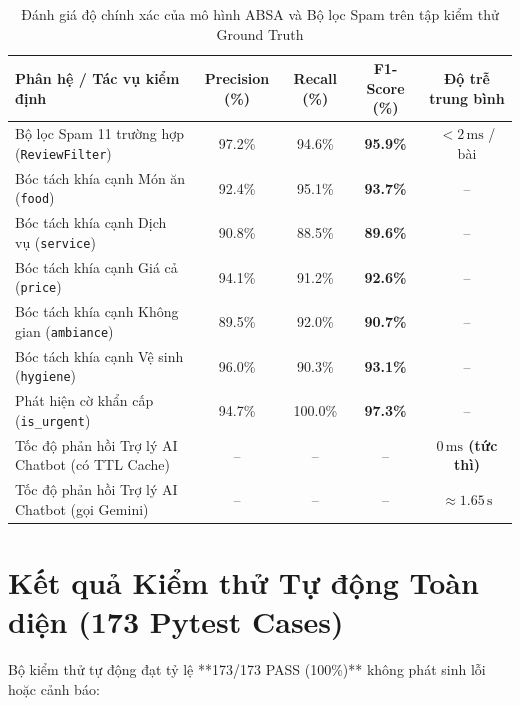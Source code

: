 \begin{table}[H]
\centering
\caption{Đánh giá độ chính xác của mô hình ABSA và Bộ lọc Spam trên tập kiểm thử Ground Truth}
\label{tab:evaluation_metrics}
\vspace{0.15cm}
\footnotesize
\begin{tabularx}{\textwidth}{l c c c c}
\toprule
\rowcolor{blue!8}
\textbf{Phân hệ / Tác vụ kiểm định} & \textbf{Precision (\%)} & \textbf{Recall (\%)} & \textbf{F1-Score (\%)} & \textbf{Độ trễ trung bình} \\
\midrule
Bộ lọc Spam 11 trường hợp (\texttt{ReviewFilter}) & 97.2\% & 94.6\% & \textbf{95.9\%} & $< 2\,\mathrm{ms}$ / bài \\
Bóc tách khía cạnh Món ăn (\texttt{food}) & 92.4\% & 95.1\% & \textbf{93.7\%} & -- \\
Bóc tách khía cạnh Dịch vụ (\texttt{service}) & 90.8\% & 88.5\% & \textbf{89.6\%} & -- \\
Bóc tách khía cạnh Giá cả (\texttt{price}) & 94.1\% & 91.2\% & \textbf{92.6\%} & -- \\
Bóc tách khía cạnh Không gian (\texttt{ambiance}) & 89.5\% & 92.0\% & \textbf{90.7\%} & -- \\
Bóc tách khía cạnh Vệ sinh (\texttt{hygiene}) & 96.0\% & 90.3\% & \textbf{93.1\%} & -- \\
Phát hiện cờ khẩn cấp (\texttt{is\_urgent}) & 94.7\% & 100.0\% & \textbf{97.3\%} & -- \\
Tốc độ phản hồi Trợ lý AI Chatbot (có TTL Cache) & -- & -- & -- & \textbf{$0\,\mathrm{ms}$ (tức thì)} \\
Tốc độ phản hồi Trợ lý AI Chatbot (gọi Gemini) & -- & -- & -- & $\approx 1.65\,\mathrm{s}$ \\
\bottomrule
\end{tabularx}
\end{table}

\section{Kết quả Kiểm thử Tự động Toàn diện (173 Pytest Cases)}
Bộ kiểm thử tự động đạt tỷ lệ **173/173 PASS (100\%)** không phát sinh lỗi hoặc cảnh báo:


